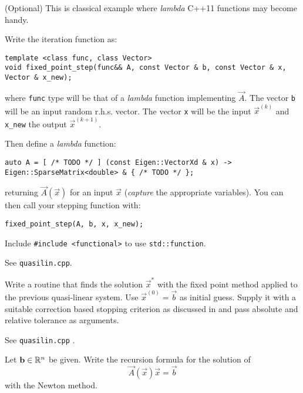 \begin{problem}
\begin{subproblem}[2]
 \begin{hint}
  (Optional) This is classical example where \emph{lambda} C++11 functions may become handy.

  Write the iteration function as:
 \begin{lstlisting}
template <class func, class Vector>
void fixed_point_step(func&& A, const Vector & b, const Vector & x, Vector & x_new);
 \end{lstlisting}
 where \verb|func| type will be that of a \emph{lambda} function implementing $\vec{A}$. The vector \verb|b| will be an input random r.h.s. vector. The vector \verb|x| will be the input $\vec{x}^{(k)}$ and \verb|x_new| the output $\vec{x}^{(k+1)}$.
 
 Then define a \emph{lambda} function:
 \begin{lstlisting}
auto A = [ /* TODO */ ] (const Eigen::VectorXd & x) -> Eigen::SparseMatrix<double> & { /* TODO */ };
 \end{lstlisting}
 returning $\vec{A}(\vec{x})$ for an input $\vec{x}$ (\emph{capture} the appropriate variables).
 You can then call your stepping function with:
 \begin{lstlisting}
fixed_point_step(A, b, x, x_new);
 \end{lstlisting}
 
 Include \verb|#include <functional>| to use \verb|std::function|.
 \end{hint}
 
 \cprotEnv \begin{solution}
  See \verb|quasilin.cpp|.
 \end{solution}
\end{subproblem}

\begin{subproblem}[1] \label{subprb:solve-quasilin-fixedpoint}
 Write a routine that finds the solution $\vec{x}^*$ with the fixed point method
 applied to the previous quasi-linear system. Use $\vec{x}^{(0)} = \vec{b}$ as
 initial guess. Supply it with a suitable correction based stopping criterion as discussed in
  and pass absolute and relative tolerance as
 arguments. 
 
 \cprotEnv \begin{solution}
  See \verb|quasilin.cpp| .
 \end{solution}
\end{subproblem}
 
 
\begin{subproblem}[1] \label{subprb:quasilin-newton}
 Let $\mathbf{b} \in \mathbb{R}^n$ be given. Write the recursion formula for the solution of 
 \[
 \vec{A}(\vec{x}) \vec{x} = \vec{b}
 \]
 with the Newton method. 
 

\end{subproblem}
\end{problem}
